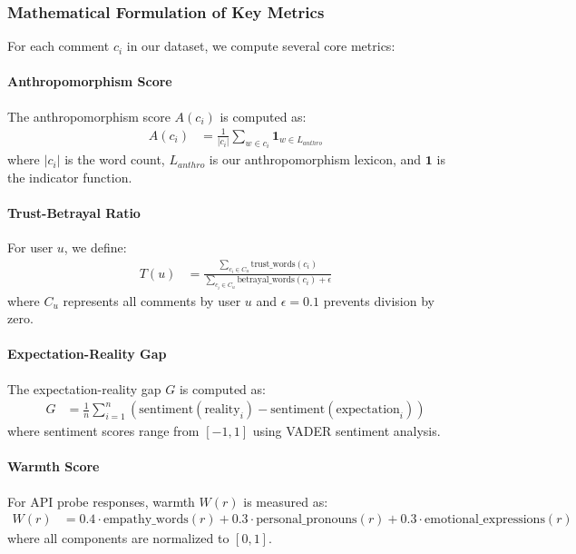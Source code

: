 \documentclass{article}
\begin{document}
\subsubsection{Mathematical Formulation of Key Metrics}

For each comment $c_i$ in our dataset, we compute several core metrics:

\paragraph{Anthropomorphism Score} The anthropomorphism score $A(c_i)$ is computed as:
\begin{align}
A(c_i) &= \frac{1}{|c_i|} \sum_{w \in c_i} \mathbf{1}_{w \in L_{anthro}} \label{eq:anthro}
\end{align}
where $|c_i|$ is the word count, $L_{anthro}$ is our anthropomorphism lexicon, and $\mathbf{1}$ is the indicator function.

\paragraph{Trust-Betrayal Ratio} For user $u$, we define:
\begin{align}
T(u) &= \frac{\sum_{c_i \in C_u} \text{trust\_words}(c_i)}{\sum_{c_i \in C_u} \text{betrayal\_words}(c_i) + \epsilon} \label{eq:trust}
\end{align}
where $C_u$ represents all comments by user $u$ and $\epsilon = 0.1$ prevents division by zero.

\paragraph{Expectation-Reality Gap} The expectation-reality gap $G$ is computed as:
\begin{align}
G &= \frac{1}{n} \sum_{i=1}^{n} (\text{sentiment}(\text{reality}_i) - \text{sentiment}(\text{expectation}_i)) \label{eq:gap}
\end{align}
where sentiment scores range from $[-1, 1]$ using VADER sentiment analysis.

\paragraph{Warmth Score} For API probe responses, warmth $W(r)$ is measured as:
\begin{align}
W(r) &= 0.4 \cdot \text{empathy\_words}(r) + 0.3 \cdot \text{personal\_pronouns}(r) + 0.3 \cdot \text{emotional\_expressions}(r) \label{eq:warmth}
\end{align}
where all components are normalized to $[0,1]$.
\end{document}
